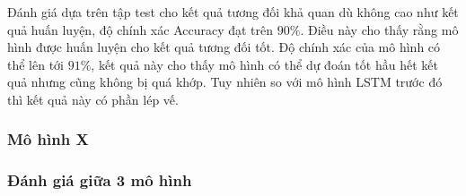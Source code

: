 Đánh giá dựa trên tập test cho kết quả tương đối khả quan dù không cao như kết quả huấn luyện, độ chính xác Accuracy đạt trên $90\%$. Điều này cho thấy rằng mô hình được huấn luyện cho kết quả tương đối tốt. Độ chính xác của mô hình có thể lên tới $91\%$, kết quả này cho thấy mô hình có thể dự đoán tốt hầu hết kết quả nhưng cũng không bị quá khớp. Tuy nhiên so với mô hình LSTM trước đó thì kết quả này có phần lép vế.

\subsubsection{Mô hình X}

\subsubsection{Đánh giá giữa 3 mô hình}